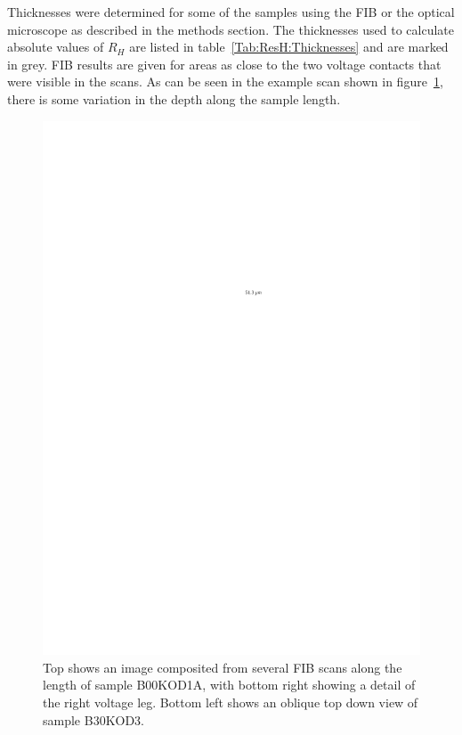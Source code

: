Thicknesses were determined for some of the samples using the \ac{FIB} or the optical microscope as described in the methods section. The thicknesses used to calculate absolute values of $R_H$ are listed in table~\ref{Tab:ResH:Thicknesses} and are marked in grey. \ac{FIB} results are given for areas as close to the two voltage contacts that were visible in the scans. As can be seen in the example scan shown in figure~\ref{Fig:ResH:FIBExamples}, there is some variation in the depth along the sample length.
\begin{figure}[htbp]
	\begin{center}
		\includegraphics[scale=0.9]{Chapter-HallBSCO/Figures/FIBExamples/FIBExamples}
		\caption{Top shows an image composited from several \ac{FIB} scans along the length of sample B00KOD1A, with bottom right showing a detail of the right voltage leg. Bottom left shows an oblique top down view of sample B30KOD3.}
		\label{Fig:ResH:FIBExamples}
	\end{center}
\end{figure}

